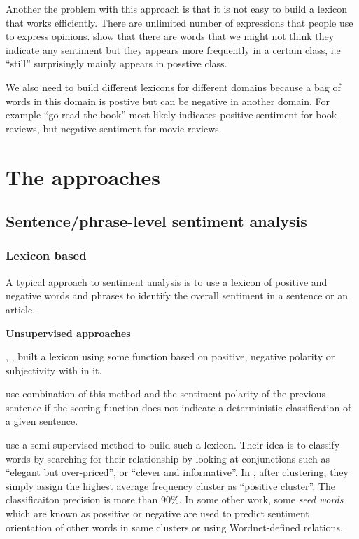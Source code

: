 \documentclass{article}
\begin{document}
\begin{multicols}{2}
    Another the problem with this approach is that it is not easy to
build a lexicon that works efficiently. There are unlimited number of
expressions that people use to express opinions. \citet{Pang2002} show that
there are words that we might not think they indicate any sentiment but they
appears more frequently in a certain class, i.e ``still'' surprisingly mainly
appears in posstive class.

    We also need to build different lexicons for different domains
because a bag of words in this domain is postive but can be negative in another
domain. For example ``go read the book'' most likely indicates positive
sentiment for book reviews, but negative sentiment for movie reviews.

 

\section{The approaches}

  \subsection{Sentence/phrase-level sentiment analysis}

    \subsubsection{Lexicon based}
      
        A typical approach to sentiment analysis is to use a lexicon of positive
  and negative words and phrases to identify the overall sentiment in a sentence
  or an article. 

        \textbf{Unsupervised approaches}

            \citet{Wiebe2000}, \citet{Turney2002}, \citet{Pan2010} built
a  lexicon using some function based on positive, negative polarity or
subjectivity  with in it.

            \citet{Liu98} use combination of this method and
the sentiment polarity of the previous sentence if the scoring function does
not indicate a deterministic classification of a given sentence.

            \citet{Hatzivassiloglou1997}
use a semi-supervised method to build such a lexicon. Their idea is to
classify words by searching for their relationship by looking at conjunctions 
such as ``elegant but over-priced'', or ``clever and informative''. In
\citet{Hatzivassiloglou1997}, after clustering, they simply assign the highest
average frequency cluster as ``positive cluster''. The classificaiton
precision is more than 90\%. In some other work, some \textit{seed words} which are
known as possitive or negative are used to predict sentiment orientation of other
words in same clusters or using Wordnet-defined relations.      		
            

\end{multicols}
\end{document}
